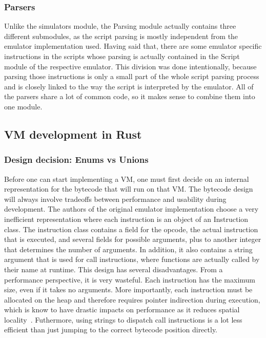 \subsubsection{Parsers}
Unlike the simulators module, the Parsing module actually contains three different submodules, as the script parsing is mostly independent from the emulator implementation used.
Having said that, there are some emulator specific instructions in the scripts whose parsing is actually contained in the Script module of the respective emulator. This division was done intentionally, because parsing those instructions is only a small part of the whole script parsing process and is closely linked to the way the script is interpreted by the emulator.
All of the parsers share a lot of common code, so it makes sense to combine them into one module.

\subsection{VM development in Rust} \label{rust-vm-dev}
\subsubsection{Design decision: Enums vs Unions}
Before one can start implementing a VM, one must first decide on an internal representation for the bytecode that will run on that VM.
The bytecode design will always involve tradeoffs between performance and usability during development.
The authors of the original emulator implementation choose a very inefficient representation where each instruction is an object of an Instruction class. The instruction class contains a field for the opcode, the actual instruction that is executed, and several fields for possible arguments, plus to another integer that determines the number of arguments.
In addition, it also contains a string argument that is used for call instructions, where functions are actually called by their name at runtime.
This design has several disadvantages. From a performance perspective, it is very wasteful. Each instruction has the maximum size, even if it takes no arguments. More importantly, each instruction must be allocated on the heap and therefore requires pointer indirection during execution, which is know to have drastic impacts on performance as it reduces spatial locality~\cite{6498541}.
Futhermore, using strings to dispatch call instructions is a lot less efficient than just jumping to the correct bytecode position directly.

